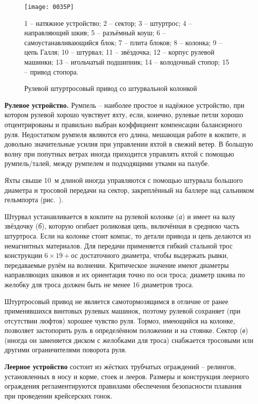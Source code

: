 \begin{figure}
  \centering
  \texttt{[image: 0035P]}
  \caption{Рулевой штуртросовый привод со штурвальной колонкой}
  \label{fig:35}
  \small
  \centering{}
  1 \--- натяжное устройство; 2 \--- сектор; 3 \--- штуртрос; 4 \--- направляющий шкив; 5 \--- разъёмный коуш; 6 \--- самоустанавливающийся блок; 7 \--- плита блоков; 8 \--- колонка; 9 \--- цепь Галля; 10 \--- штурвал; 11 \--- звёздочка; 12 \--- корпус рулевой машинки; 13 \--- игольчатый подшипник; 14 \--- колодочный стопор; 15 \--- привод стопора.
\smallskip
\end{figure}

\textbf{Рулевое устройство.} Румпель \---
наиболее простое и надёжное устройство, при котором рулевой хорошо
чувствует яхту, если, конечно, рулевые петли хорошо отцентрированы и
правильно выбран коэффициент компенсации балансирного
руля. Недостатком румпеля являются его длина, мешающая работе в
кокпите, и довольно значительные усилия при управлении яхтой в свежий
ветер. В большую волну при попутных ветрах иногда приходится управлять
яхтой с помощью румпель\-/талей, между румпелем и подходящими утками
на палубе.

Яхты свыше 10~м длиной иногда управляются с помощью штурвала большого
диаметра и тросовой передачи на сектор, закреплённый на баллере над
сальником гельмпорта (рис.~).

Штурвал устанавливается в кокпите на рулевой колонке (\textit{а}) и
имеет на валу звёздочку (\textit{б}), которую огибает роликовая цепь,
включённая в среднюю часть штуртроса. Если на колонке стоит компас, то
детали привода и цепь делаются из немагнитных материалов. Для передачи
применяется гибкий стальной трос конструкции $6 \times 19 +$ос
достаточного диаметра, чтобы выдержать рывки, передаваемые рулём на
волнении. Критическое значение имеют диаметры направляющих шкивов и их
ориентация точно по оси троса; диаметр шкива по желобку для троса
должен быть не менее 16 диаметров троса.

Штуртросовый привод не является самотормозящимся в отличие от ранее
применявшихся винтовых рулевых машинок, поэтому рулевой сохраняет (при
отсутствии люфтов) хорошее чувство руля. Тормоз, имеющийся на колонке,
позволяет застопорить руль в определённом положении и на
стоянке. Сектор (\textit{в}) (иногда он заменяется диском с желобками
для троса) снабжается тросовыми или другими ограничителями поворота
руля.
 
\textbf{Леерное устройство} состоит из
жёстких трубчатых ограждений \--- релингов, установленных в носу и
корме, стоек и лееров. Размеры и конструкция леерного ограждения
регламентируются правилами обеспечения безопасности плавания при
проведении крейсерских гонок.

